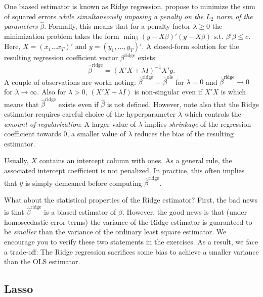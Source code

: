 \documentclass[
]{krantz}
\begin{document}
One biased estimator is known as Ridge regression. \citet{Hoerl1970} propose to minimize the sum of squared errors \emph{while simultaneously imposing a penalty on the \(L_2\) norm of the parameters} \(\hat\beta\). Formally, this means that for a penalty factor \(\lambda\geq 0\) the minimization problem takes the form \(\min_\beta \left(y - X\beta\right)'\left(y - X\beta\right)\text{ s.t. } \beta'\beta \leq c\). Here, \(X = \left(x_1 \ldots x_T\right)'\) and \(y = \left(y_1, \ldots, y_T\right)'\). A closed-form solution for the resulting regression coefficient vector \(\beta^\text{ridge}\) exists: \[\hat{\beta}^\text{ridge} = \left(X'X + \lambda I\right)^{-1}X'y.\] A couple of observations are worth noting: \(\hat\beta^\text{ridge} = \hat\beta^\text{ols}\) for \(\lambda = 0\) and \(\hat\beta^\text{ridge} \rightarrow 0\) for \(\lambda\rightarrow \infty\). Also for \(\lambda > 0\), \(\left(X'X + \lambda I\right)\) is non-singular even if \(X'X\) is which means that \(\hat\beta^\text{ridge}\) exists even if \(\hat\beta\) is not defined. However, note also that the Ridge estimator requires careful choice of the hyperparameter \(\lambda\) which controls the \emph{amount of regularization}: A larger value of \(\lambda\) implies \emph{shrinkage} of the regression coefficient towards 0, a smaller value of \(\lambda\) reduces the bias of the resulting estimator.

Usually, \(X\) contains an intercept column with ones. As a general rule, the associated intercept coefficient is not penalized. In practice, this often implies that \(y\) is simply demeaned before computing \(\hat\beta^\text{ridge}\).

What about the statistical properties of the Ridge estimator? First, the bad news is that \(\hat\beta^\text{ridge}\) is a biased estimator of \(\beta\). However, the good news is that (under homoscedastic error terms) the variance of the Ridge estimator is guaranteed to be \emph{smaller} than the variance of the ordinary least square estimator. We encourage you to verify these two statements in the exercises. As a result, we face a trade-off: The Ridge regression sacrifices some bias to achieve a smaller variance than the OLS estimator.

\hypertarget{lasso}{%
\subsection{Lasso}\label{lasso}}
\end{document}
